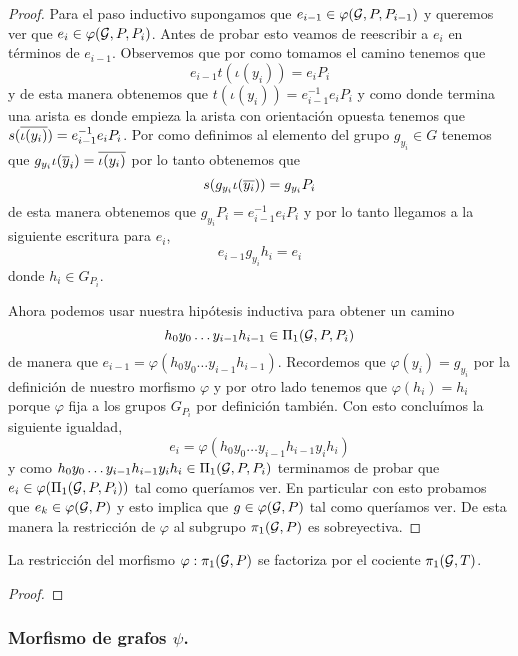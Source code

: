 \documentclass[tesis.tex]{subfiles}
\begin{document}
\begin{proof}
	Para el paso inductivo supongamos que $e_{i-1} \in \varphi({\cal G}, P, P_{i-1})$ y queremos ver que $e_i \in \varphi({\cal G}, P, P_{i})$.
	Antes de probar esto veamos de reescribir a $e_i$ en términos de $e_{i-1}$.
	Observemos que por como tomamos el camino tenemos que
	\[
		e_{i-1} t(\iota (y_i)) = e_i P_i 
	\]
	y de esta manera obtenemos que $t(\iota (y_i)) = e_{i-1}^{-1} e_i P_i$ y como donde termina una arista es donde empieza la arista con orientación opuesta tenemos que $s(\overline{\iota(y_i)}) = e_{i-1}^{-1} e_i P_i$. 
	Por como definimos al elemento del grupo $g_{y_i} \in G$ tenemos que $g_{y_i} \iota (\overline y_i) = \overline{\iota (y_i)}$ por lo tanto obtenemos que 
	\[
		s(g_{y_i} \iota (\overline{y_i})) = g_{y_i} P_i
	\]
	de esta manera obtenemos que $g_{y_i} P_i = e_{i-1}^{-1} e_i P_i$ y por lo tanto llegamos a la siguiente escritura para $e_i$,
	\begin{equation*}
		e_{i-1}g_{y_i} h_i  = e_i 
	\end{equation*}
	donde $h_i \in G_{P_i}$. 
	
	Ahora podemos usar nuestra hipótesis inductiva para obtener un camino 
	\[
		h_0y_0 \dots y_{i-1}h_{i-1} \in \Pi_1({\cal G}, P, P_i)
	\]
	de manera que $e_{i-1} =  \varphi(h_0y_0 \dots y_{i-1}h_{i-1})$. 
	Recordemos que $\varphi(y_i) = g_{y_i}$ por la definición de nuestro morfismo $\varphi$ y por otro lado tenemos que $\varphi(h_i) = h_i$ porque $\varphi$ fija a los grupos $G_{P_i}$ por definición también.
	Con esto concluímos la siguiente igualdad,
	\[
		e_i = \varphi(h_0y_0 \dots y_{i-1}h_{i-1} y_i h_i)
	\]
	y como $h_0y_0 \dots y_{i-1}h_{i-1} y_i h_i \in \Pi_1({\cal G}, P, P_i)$ terminamos de probar que $e_{i} \in \varphi(\Pi_1({\cal G}, P, P_i))$ tal como queríamos ver. 
	En particular con esto probamos que $e_k \in \varphi({\cal G}, P)$ y esto implica que $g \in \varphi({\cal G}, P)$ tal como queríamos ver.
	De esta manera la restricción de $\varphi$ al subgrupo $\pi_1({\cal G}, P)$ es sobreyectiva.
	
		
\end{proof}

\begin{coro}
	La restricción del morfismo $\varphi: \pi_1({\cal G}, P)$ se factoriza por el cociente $\pi_1({\cal G}, T)$.
\end{coro}
\begin{proof}
\end{proof}

\subsubsection{Morfismo de grafos $\psi$.}
\end{document}
